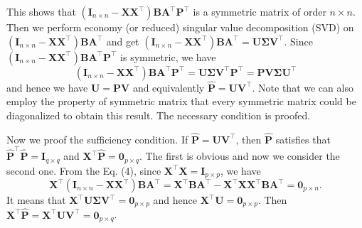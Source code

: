 \documentclass[titlepage,11pt,twoside]{article}
\begin{document}
This shows that $(\mathbf{I}_{n\times n}-\mathbf{X}\mathbf{X}^{\top})\mathbf{B}\mathbf{A}^{\top}\mathbf{P}^{\top}$ is a symmetric matrix of order $n\times n$. Then we perform economy (or reduced) singular value decomposition (SVD) on $(\mathbf{I}_{n\times n}-\mathbf{X}\mathbf{X}^{\top})\mathbf{B}\mathbf{A}^{\top}$ and get 
$(\mathbf{I}_{n\times n}-\mathbf{X}\mathbf{X}^{\top})\mathbf{B}\mathbf{A}^{\top}=\mathbf{U}\mathbf{\Sigma}\mathbf{V}^{\top}$.
Since $(\mathbf{I}_{n\times n}-\mathbf{X}\mathbf{X}^{\top})\mathbf{B}\mathbf{A}^{\top}\mathbf{P}^{\top}$ is symmetric, we have
\begin{equation}
(\mathbf{I}_{n\times n}-\mathbf{X}\mathbf{X}^{\top})\mathbf{B}\mathbf{A}^{\top}\mathbf{P}^{\top}
=
\mathbf{U}\mathbf{\Sigma}\mathbf{V}^{\top}\mathbf{P}^{\top}
=
\mathbf{P}\mathbf{V}\mathbf{\Sigma}\mathbf{U}^{\top}
\end{equation}
and hence we have $\mathbf{U}=\mathbf{P}\mathbf{V}$ and equivalently $\mathbf{\hat{P}}=\mathbf{U}\mathbf{V}^{\top}$. Note that we can also employ the property of symmetric matrix that every symmetric matrix could be diagonalized to obtain this result. The necessary condition is proofed. 

Now we proof the sufficiency condition. If $\mathbf{\hat{P}}=\mathbf{U}\mathbf{V}^{\top}$, then $\mathbf{\hat{P}}$ satisfies that $\mathbf{\hat{P}}^{\top}\mathbf{\hat{P}}=\mathbf{I}_{q\times q}$ and $\mathbf{X}^{\top}\mathbf{\hat{P}}=\mathbf{0}_{p\times q}$. The first is obvious and now we consider the second one. From the Eq. (4), since $\mathbf{X}^{\top}\mathbf{X}=\mathbf{I}_{p\times p}$, we have  
\begin{equation}
\mathbf{X}^{\top}(\mathbf{I}_{n\times n}-\mathbf{X}\mathbf{X}^{\top})\mathbf{B}\mathbf{A}^{\top}=\mathbf{X}^{\top}\mathbf{B}\mathbf{A}^{\top}-\mathbf{X}^{\top}\mathbf{X}\mathbf{X}^{\top}\mathbf{B}\mathbf{A}^{\top}
=
\mathbf{0}_{p\times n}
.
\end{equation}
It means that $\mathbf{X}^{\top}\mathbf{U}\mathbf{\Sigma}\mathbf{V}^{\top}=\mathbf{0}_{p\times p}$ and hence $\mathbf{X}^{\top}\mathbf{U}=\mathbf{0}_{p\times p}$. Then $\mathbf{X}^{\top}\mathbf{\hat{P}}=\mathbf{X}^{\top}\mathbf{U}\mathbf{V}^{\top}=\mathbf{0}_{p\times q}$.
\end{document}
